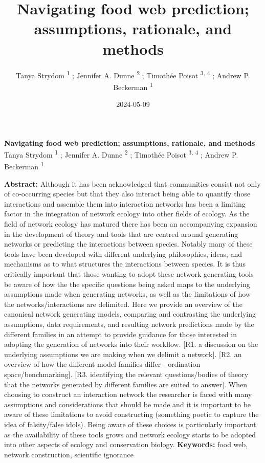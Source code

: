 \documentclass[
]{article}
\title{Navigating food web prediction; assumptions, rationale, and
methods}
\author{Tanya Strydom %
%
\textsuperscript{%
%
1%
}%
; Jennifer A. Dunne %
%
\textsuperscript{%
%
2%
}%
; Timothée Poisot %
%
\textsuperscript{%
3,%
4%
}%
; Andrew P. Beckerman %
%
\textsuperscript{%
%
1%
}%
}
\date{2024-05-09}
\begin{document}
\thispagestyle{empty}
{\bfseries\sffamily\Large Navigating food web prediction; assumptions,
rationale, and methods}
\vfil
Tanya Strydom %
%
\textsuperscript{%
%
1%
}%
; Jennifer A. Dunne %
%
\textsuperscript{%
%
2%
}%
; Timothée Poisot %
%
\textsuperscript{%
3,%
4%
}%
; Andrew P. Beckerman %
%
\textsuperscript{%
%
1%
}%

\vfil
{\small
\textbf{Abstract:} Although it has been acknowledged that communities
consist not only of co-occurring species but that they also interact
being able to quantify those interactions and assemble them into
interaction networks has been a limiting factor in the integration of
network ecology into other fields of ecology. As the field of network
ecology has matured there has been an accompanying expansion in the
development of theory and tools that are centred around generating
networks or predicting the interactions between species. Notably many of
these tools have been developed with different underlying philosophies,
ideas, and mechanisms as to what structures the interactions between
species. It is thus critically important that those wanting to adopt
these network generating tools be aware of how the the specific
questions being asked maps to the underlying assumptions made when
generating networks, as well as the limitations of how the
networks/interactions are delimited. Here we provide an overview of the
canonical network generating models, comparing and contrasting the
underlying assumptions, data requirements, and resulting network
predictions made by the different families in an attempt to provide
guidance for those interested in adopting the generation of networks
into their workflow. {[}R1. a discussion on the underlying assumptions
we are making when we delimit a network{]}. {[}R2. an overview of how
the different model families differ - ordination space/benchmarking{]}.
{[}R3. identifying the relevant questions/bodies of theory that the
networks generated by different families are suited to answer{]}. When
choosing to construct an interaction network the researcher is faced
with many assumptions and considerations that should be made and it is
important to be aware of these limitations to avoid constructing
(something poetic to capture the idea of falsity/false idols). Being
aware of these choices is particularly important as the availability of
these tools grows and network ecology starts to be adopted into other
aspects of ecology and conservation biology.
\vfil
\textbf{Keywords:} %
food web, network construction, %
scientific ignorance%
}
\clearpage
\setcounter{page}{1}
\doublespacing
\linenumbers
\end{document}
